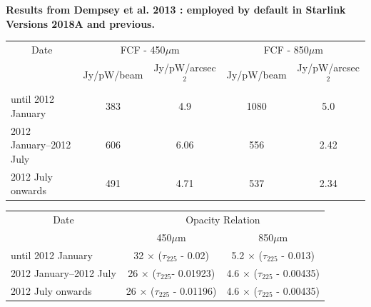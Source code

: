 \textbf{Results from Dempsey et al. 2013 \cite{dempsey12}: employed by
default in Starlink Versions 2018A and previous.}\\
\begin{table}[h!]
\begin{center}
\begin{tabular}{|l|c|c|c|c|}
 \hline
 \multicolumn{1}{|c|}{Date} &
 \multicolumn{2}{c|}{FCF - 450$\mu$m} &
 \multicolumn{2}{c|}{FCF - 850$\mu$m} \\
\cline{2-5}
& Jy/pW/beam &Jy/pW/arcsec$^2$ & Jy/pW/beam &Jy/pW/arcsec$^2$ \\
 \hline
until 2012 January       &383 & 4.9&1080 &5.0 \\
2012 January--2012 July  &606&6.06 &556 &2.42 \\
2012 July onwards        &491 &4.71 &537 &2.34 \\
\hline
\end{tabular}
\end{center}
\end{table}
\vspace{-2mm}
\begin{table}[h!]
\begin{center}
\begin{tabular}{|l|c|c|}
 \hline
 \multicolumn{1}{|c}{Date} & \multicolumn{2}{|c|}{Opacity Relation}  \\ \cline{2-3}
                           & 450$\mu$m  & 850$\mu$m \\ \hline
until 2012 January       & 32 $\times$ ($\tau_{225}$ - 0.02)    & 5.2 $\times$ ($\tau_{225}$ - 0.013)  \\
2012 January--2012 July  & 26 $\times$ ($\tau_{225}$- 0.01923)  & 4.6 $\times$ ($\tau_{225}$ - 0.00435)  \\
2012 July onwards        & 26 $\times$ ($\tau_{225}$ - 0.01196) & 4.6 $\times$ ($\tau_{225}$ - 0.00435)  \\
\hline
\end{tabular}
\end{center}
\end{table}
